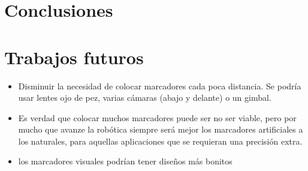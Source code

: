 \chapter{Conclusiones} \label{chp-conclusiones}

\chapter{Trabajos futuros}

\begin{itemize}
\item Disminuir la necesidad de colocar marcadores cada poca distancia. Se podría usar lentes ojo de pez, varias cámaras (abajo y delante) o un gimbal.  
\item Es verdad que colocar muchos marcadores puede ser no ser viable, pero por mucho que avanze la robótica siempre será mejor los marcadores artificiales a los naturales, para aquellas aplicaciones que se requieran una precisión extra.
\item los marcadores visuales podrían tener diseños más bonitos
\end{itemize}

\endinput
